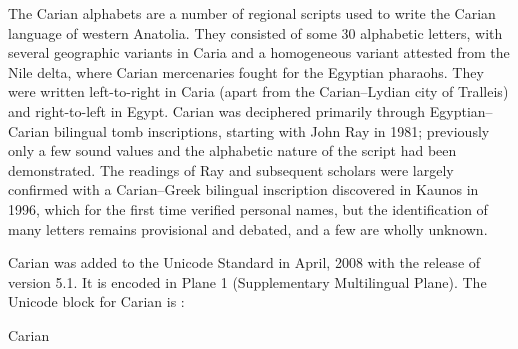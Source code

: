 The Carian alphabets are a number of regional scripts used to write the Carian language of western Anatolia. They consisted of some 30 alphabetic letters, with several geographic variants in Caria and a homogeneous variant attested from the Nile delta, where Carian mercenaries fought for the Egyptian pharaohs. They were written left-to-right in Caria (apart from the Carian–Lydian city of Tralleis) and right-to-left in Egypt. Carian was deciphered primarily through Egyptian–Carian bilingual tomb inscriptions, starting with John Ray in 1981; previously only a few sound values and the alphabetic nature of the script had been demonstrated. The readings of Ray and subsequent scholars were largely confirmed with a Carian–Greek bilingual inscription discovered in Kaunos in 1996, which for the first time verified personal names, but the identification of many letters remains provisional and debated, and a few are wholly unknown.

Carian was added to the Unicode Standard in April, 2008 with the release of version 5.1. It is encoded in Plane 1 (Supplementary Multilingual Plane).
The Unicode block for Carian is :

\begin{scriptexample}[]{Carian}
\end{scriptexample}





